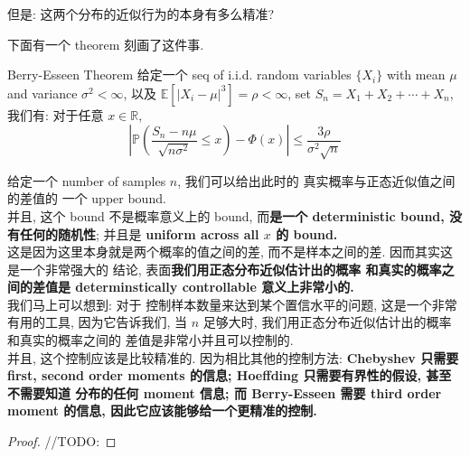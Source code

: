 但是: 这两个分布的近似行为的本身有多么精准?

下面有一个 theorem 刻画了这件事.
\begin{theorem}{Berry-Esseen Theorem}
给定一个 seq of i.i.d. random variables $\{X_i\}$
 with mean $\mu$ and variance $\sigma^2 < \infty$, 
 以及 $\mathbb{E}[|X_i - \mu|^3]= \rho < \infty$,
 set $S_n = X_1 + X_2 + \cdots + X_n$, 
 我们有: 对于任意 $x \in \mathbb{R}$,
 $$ 
 \left|\mathbb{P}\left(\frac{S_n-n \mu}{\sqrt{n \sigma^2}} \leq x\right)-\Phi(x)\right| \leq \frac{3 \rho}{\sigma^2 \sqrt{n}}
$$
\end{theorem}
\begin{remark}
给定一个 number of samples $n$, 
我们可以给出此时的
真实概率与正态近似值之间的差值的 
一个 upper bound. \\

并且, 这个 bound 不是概率意义上的 bound,
而\textbf{是一个 deterministic bound, 
没有任何的随机性}; 并且是 
\textbf{uniform across all $x$ 的 bound.}\\

这是因为这里本身就是两个概率的值之间的差,
而不是样本之间的差. 因而其实这是一个非常强大的
结论, 表面\textbf{我们用正态分布近似估计出的概率
和真实的概率之间的差值是 determinstically 
controllable 意义上非常小的.}\\

我们马上可以想到: 对于
控制样本数量来达到某个置信水平的问题, 
这是一个非常有用的工具, 因为它告诉我们, 当 $n$ 足够大时,
我们用正态分布近似估计出的概率和真实的概率之间的
差值是非常小并且可以控制的.\\
并且, 这个控制应该是比较精准的. 
因为相比其他的控制方法:
\textbf{Chebyshev 只需要 first, second order 
moments 的信息; Hoeffding 
只需要有界性的假设, 甚至不需要知道
分布的任何 moment 信息; 而 
Berry-Esseen 需要 third order moment 的信息, 
因此它应该能够给一个更精准的控制.}

\end{remark}
\begin{proof}
//TODO:
\end{proof}

